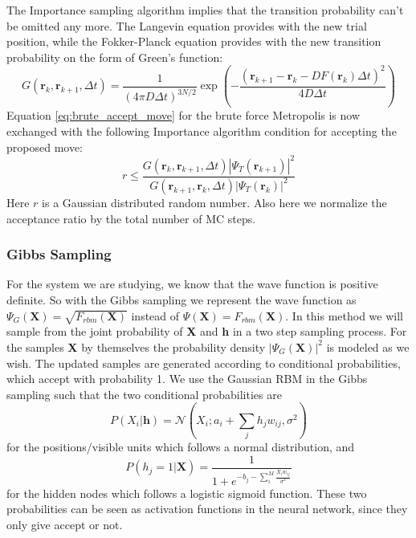 \documentclass[12pt,a4paper,english]{article}
\begin{document}
The Importance sampling algorithm implies that the transition probability can't be omitted any more. The Langevin equation provides with the new trial position, while the Fokker-Planck equation provides with the new transition probability on the form of Green's function:
\begin{equation}
\label{eq:Green}
G(\textbf{r}_k,\textbf{r}_{k+1},\Delta t)=\frac{1}{(4\pi D\Delta t)^{3N/2}}\exp\left(-\frac{(\textbf{r}_{k+1}-\textbf{r}_{k}-DF(\textbf{r}_k)\Delta t)^2}{4D\Delta t}\right)
\end{equation}
Equation \ref{eq:brute_accept_move} for the brute force Metropolis is now exchanged with the following Importance algorithm condition for accepting the proposed move:
\begin{equation}
\label{eq:importance_accept_move}
r\leq\frac{G(\textbf{r}_k,\textbf{r}_{k+1},\Delta t)|\Psi_T(\textbf{r}_{k+1})|^2}{G(\textbf{r}_{k+1},\textbf{r}_{k},\Delta t)|\Psi_T(\textbf{r}_k)|^2}
\end{equation}
Here $r$ is a Gaussian distributed random number. Also here we normalize the acceptance ratio by the total number of MC steps.

\subsubsection{Gibbs Sampling}
\label{subsubsect:Gibbs}
For the system we are studying, we know that the wave function is positive definite. So with the Gibbs sampling we represent the wave function as $\Psi_G(\textbf{X})=\sqrt{F_{rbm}(\textbf{X})}$ instead of $\Psi(\textbf{X})=F_{rbm}(\textbf{X})$. In this method we will sample from the joint probability of \textbf{X} and \textbf{h} in a two step sampling process. For the samples \textbf{X} by themselves the probability density $|\Psi_G(\textbf{X})|^2$ is modeled as we wish. The updated samples are generated according to conditional probabilities, which accept with probability 1. We use the Gaussian RBM in the Gibbs sampling such that the two conditional probabilities are 
\begin{equation}
\label{eq:prob_visible}
P(X_i|\textbf{h})=\mathcal{N}(X_i; a_i+\sum_{j}h_jw_{ij},\sigma^2)
\end{equation}
for the positions/visible units which follows a normal distribution, and
\begin{equation}
\label{eq:prob_hidden}
P(h_j=1|\textbf{X})=\frac{1}{1+e^{-b_j -\sum_{i}^{M}\frac{X_iw_{ij}}{\sigma^2}}}
\end{equation}
for the hidden nodes which follows a logistic sigmoid function. These two probabilities can be seen as activation functions in the neural network, since they only give accept or not. 
\end{document}
